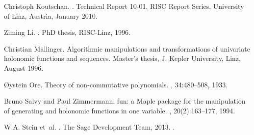 \documentclass[11pt]{amsart}
\begin{document}
\begin{thebibliography}{10}
Christoph Koutschan.
.
\newblock Technical Report 10-01, RISC Report Series, University of Linz,
  Austria, January 2010.

Ziming Li.
.
\newblock PhD thesis, RISC-Linz, 1996.

Christian Mallinger.
\newblock Algorithmic manipulations and transformations of univariate holonomic
  functions and sequences.
\newblock Master's thesis, J. Kepler University, Linz, August 1996.

{\O}ystein Ore.
\newblock Theory of non-commutative polynomials.
, 34:480--508, 1933.

Bruno Salvy and Paul Zimmermann.
fun: a {M}aple package for the manipulation of generating and
  holonomic functions in one variable.
, 20(2):163--177,
  1994.

W.\thinspace{}A. Stein et~al.
.
\newblock The Sage Development Team, 2013.
.

\end{thebibliography}

 
\end{document}
